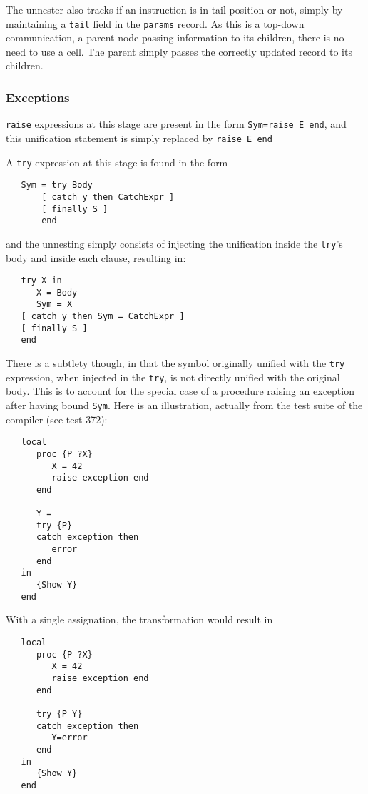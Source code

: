 \documentclass[a4paper]{memoir}
\begin{document}
The unnester also tracks if an instruction is in tail position or not, simply by
maintaining a \lstinline!tail! field in the \lstinline!params! record. As this
is a top-down communication, a parent node passing information to its children,
there is no need to use a cell. The parent simply passes the correctly updated
record to its children.

\subsubsection{Exceptions}\label{sec:arch:unnester:exceptions}
\lstinline!raise! expressions at this stage are present in the form
\lstinline!Sym=raise E end!, and this unification statement is simply replaced by
\lstinline!raise E end! 

A \lstinline!try! expression at this stage is found in the form 
\begin{lstlisting}
   Sym = try Body 
       [ catch y then CatchExpr ] 
       [ finally S ] 
       end
\end{lstlisting}
and the unnesting simply consists of injecting the unification inside the
\lstinline!try!'s body and inside each clause, resulting in:
\begin{lstlisting}
   try X in 
      X = Body 
      Sym = X 
   [ catch y then Sym = CatchExpr ] 
   [ finally S ] 
   end
\end{lstlisting}

There is a subtlety though, in that the symbol originally unified with the \lstinline!try!
expression, when injected in the \lstinline!try!, is not directly unified with
the original body. This is to account for the special case of a procedure
raising an exception after having bound \lstinline!Sym!. Here is an
illustration, actually from the test suite of the compiler (see test 372):
\begin{lstlisting}
   local
      proc {P ?X}
         X = 42
         raise exception end
      end
   
      Y =
      try {P}
      catch exception then
         error
      end
   in
      {Show Y}
   end
\end{lstlisting}
With a single assignation, the transformation would result in 
\begin{lstlisting}
   local
      proc {P ?X}
         X = 42
         raise exception end
      end
   
      try {P Y}
      catch exception then
         Y=error
      end
   in
      {Show Y}
   end
\end{lstlisting}
\end{document}
